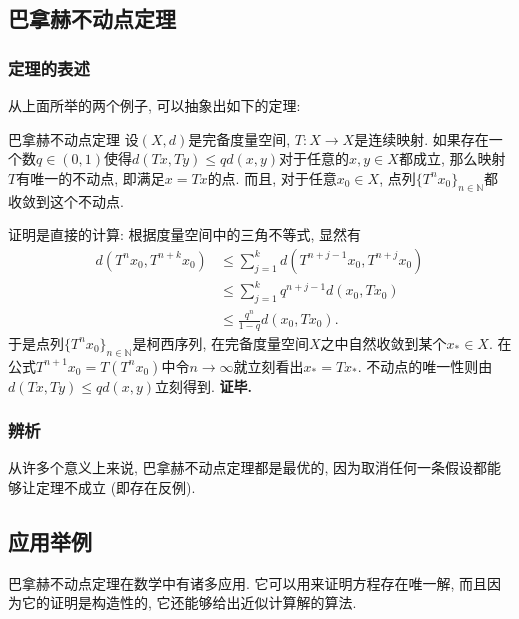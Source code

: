 \subsection{巴拿赫不动点定理}
\subsubsection{定理的表述}
从上面所举的两个例子, 可以抽象出如下的定理:
\begin{theorem}{巴拿赫不动点定理}
设$(X,d)$是完备度量空间, $T:X\to X$是连续映射. 如果存在一个数$q\in(0,1)$使得$d(Tx,Ty)\leq qd(x,y)$对于任意的$x,y\in X$都成立, 那么映射$T$有唯一的不动点, 即满足$x=Tx$的点. 而且, 对于任意$x_0\in X$, 点列$\{T^nx_0\}_{n\in\mathbb{N}}$都收敛到这个不动点.
\end{theorem}
证明是直接的计算: 根据度量空间中的三角不等式, 显然有
$$
\begin{aligned}
d(T^nx_0,T^{n+k}x_0)
&\leq \sum_{j=1}^k d(T^{n+j-1}x_0,T^{n+j}x_0)\\
&\leq \sum_{j=1}^k q^{n+j-1}d(x_0,Tx_0)\\
&\leq \frac{q^n}{1-q}d(x_0,Tx_0).
\end{aligned}
$$
于是点列$\{T^nx_0\}_{n\in\mathbb{N}}$是柯西序列, 在完备度量空间$X$之中自然收敛到某个$x_*\in X$. 在公式$T^{n+1}x_0=T(T^nx_0)$中令$n\to\infty$就立刻看出$x_*=Tx_*$. 不动点的唯一性则由$d(Tx,Ty)\leq qd(x,y)$立刻得到. \textbf{证毕.}

\subsubsection{辨析}
从许多个意义上来说, 巴拿赫不动点定理都是最优的, 因为取消任何一条假设都能够让定理不成立 (即存在反例).

\subsection{应用举例}
巴拿赫不动点定理在数学中有诸多应用. 它可以用来证明方程存在唯一解, 而且因为它的证明是构造性的, 它还能够给出近似计算解的算法.
